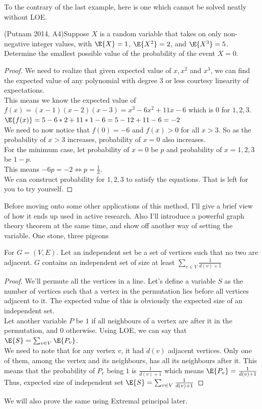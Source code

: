 To the contrary of the last example, here is one which cannot be solved neatly without LOE.\\
\begin{example}
    (Putnam 2014, A4)Suppose $X$ is a random variable that takes on only non-negative integer values, with $\E{X}=1$, $\E{X^2} = 2$, and $\E{X^3} = 5$. Determine the smallest possible value of the probability of the event $X=0$.
\end{example}
\begin{proof}
    We need to realize that given expected value of $x, x^2$ and $x^3$, we can find the expected value of any polynomial with degree $3$ or less courtesy linearity of expectations.\\
    This means we know the expected value of $f(x)=(x-1)(x-2)(x-3)=x^3-6x^2+11x-6$ which is $0$ for $1,2,3$.\\
    $\E{f(x)}=5-6*2+11*1-6=5-12+11-6=-2$\\
    We need to now notice that $f(0)=-6$ and $f(x)>0$ for all $x>3$. So as the probability of $x>3$ increases, probability of $x=0$ also increases.\\
    For the minimum case, let probability of $x=0$ be $p$ and probability of $x=1,2,3$ be $1-p$.\\
    This means $-6p=-2 \iff p=\frac{1}{3}$.\\
    We can construct probability for $1,2,3$ to satisfy the equations. That is left for you to try yourself.
\end{proof}
Before moving onto some other applications of this method, I'll give a brief view of how it ends up used in active research. Also I'll introduce a powerful graph theory theorem at the same time, and show off another way of setting the variable. One stone, three pigeons\\
\begin{theorem}
 For $G = (V, E)$. Let an independent set be a set of vertices such that no two are adjacent. $G$ contains an independent set of size at least $\sum_{v \in V}\frac{1}{d(v)+1}$
\end{theorem}
\begin{proof}
We'll permute all the vertices in a line. Let's define a variable $S$ as the number of vertices such that a vertex in the permutation lies before all vertices adjacent to it. The expected value of this is obviously the expected size of an independent set.\\
Let another variable $P$ be $1$ if all neighbours of a vertex are after it in the permutation, and $0$ otherwise. Using LOE, we can say that $\E{S}=\sum_{v \in V} \E{P_v}$.\\
We need to note that for any vertex $v$, it had $d(v)$ adjacent vertices. Only one of them, among the vertex and its neighbours, has all its neighbours after it. This means that the probability of $P_v$ being $1$ is $\frac{1}{d(v)+1}$ which means $\E{P_v}=\frac{1}{d(v)+1}$\\
Thus, expected size of independent set $\E{S}=\sum_{v \in V}\frac{1}{d(v)+1}$
\end{proof}
We will also prove the same using Extremal principal later.\\

